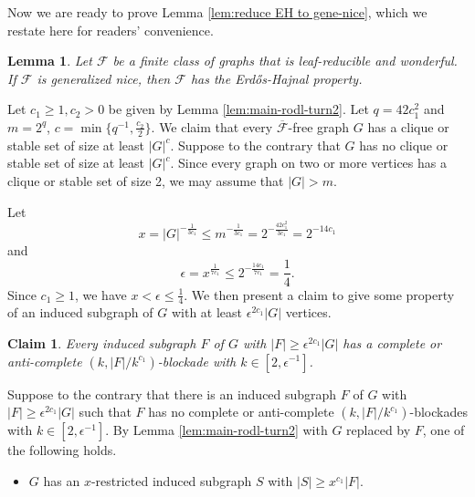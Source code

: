 \documentclass[a4paper,11pt]{article}
\newtheorem{lemma}[theorem]{Lemma}
\newtheorem{claim}{Claim}[theorem]
\let\oldendproof\endproof
\renewenvironment{proof}[1][\proofname]{%
	\oldproof[\normalfont\bfseries #1]%
}{\oldendproof}
\renewcommand{\qedsymbol}{$\square$}%
\newenvironment{subproof}[1][\normalfont\it Subproof]{%
	\renewcommand{\qedsymbol}{{\tiny{$\blacksquare$}}}%
	\begin{proof}[#1]%
	}{%
	\end{proof}%
}
\begin{document}
    Now we are ready to prove Lemma \ref{lem:reduce EH to gene-nice}, which we restate here for readers' convenience. 

    \begin{lemma}\label{lem:reduce EH to gene-nice 2}
        Let $\mathcal{F}$ be a finite class of graphs that is leaf-reducible and wonderful. If $\mathcal{F}$ is generalized nice, then $\mathcal{F}$ has the Erd\H{o}s-Hajnal property. 
    \end{lemma}
    
    \begin{proof}
        Let $c_1\geq 1,c_2>0$ be given by Lemma \ref{lem:main-rodl-turn2}. 
        Let $q=42c_1^2$ and $m=2^q$, $c=\min\{q^{-1},\frac{c_2}{2}\}$. 
        We claim that every $\overline{\mathcal{F}}$-free graph $G$ has a clique or stable set of size at least $|G|^c$. 
        Suppose to the contrary that $G$ has no clique or stable set of size at least $|G|^c$. 
        Since every graph on two or more vertices has a clique or stable set of size 2, we may assume that $|G|>m$. 
     
        Let $$x=|G|^{-\frac{1}{3c_1}}\leq m^{-\frac{1}{3c_1}}=2^{-\frac{42c_1^2}{3c_1}}=2^{-14c_1}$$ 
        and 
        $$\epsilon=x^{\frac{1}{7c_1}}\leq 2^{-\frac{14c_1}{7c_1}}=\frac{1}{4}.$$ 
        Since $c_1\geq 1$, we have $x<\epsilon\leq\frac{1}{4}$. 
        We then present a claim to give some property of an induced subgraph of $G$ with at least $\epsilon^{2c_1}|G|$ vertices. 
        \begin{claim}\label{clm:a large F of G has a complete or anti-complete blockade with small length}
            Every induced subgraph $F$ of $G$ with $|F|\geq \epsilon^{2c_1}|G|$ has a complete or anti-complete $(k,|F|/k^{c_1})$-blockade with $k\in[2,\epsilon^{-1}]$.
        \end{claim}
        \begin{subproof}[Proof of Claim \ref{clm:a large F of G has a complete or anti-complete blockade with small length}]
            Suppose to the contrary that there is an induced subgraph $F$ of $G$ with $|F|\geq \epsilon^{2c_1}|G|$ such that $F$ has no complete or anti-complete $(k,|F|/k^{c_1})$-blockades with $k\in[2,\epsilon^{-1}]$.
            By Lemma \ref{lem:main-rodl-turn2} with $G$ replaced by $F$, one of the following holds.  
            \begin{itemize}
                \item $G$ has an $x$-restricted induced subgraph $S$ with $|S|\geq x^{c_1}|F|$.
            

\end{itemize}
\end{subproof}
\end{proof}
\end{document}
